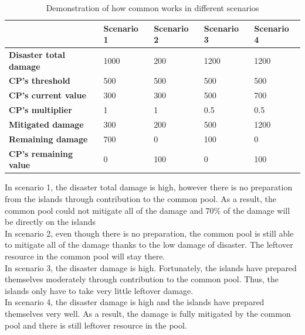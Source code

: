 \begin{table}[h]
\begin{center} 
\begin{tabular}{|p{0.9in}|p{0.9in}|p{0.9in}|p{0.9in}|p{0.9in}|} \hline
& \textbf{Scenario 1} & \textbf{Scenario 2} & \textbf{Scenario 3} & \textbf{Scenario 4} \\ \hline
\textbf{Disaster total damage} & 1000 & 200 & 1200 & 1200 \\ \hline
\textbf{CP's threshold} & 500 & 500 & 500 & 500 \\ \hline
\textbf{CP's current value} & 300 & 300 & 500 & 700 \\ \hline
\textbf{CP's multiplier} & 1 & 1 & 0.5 & 0.5 \\ \hline
\textbf{Mitigated damage} & 300 & 200 & 500 & 1200 \\ \hline
\textbf{Remaining damage} & 700 & 0 & 100 & 0 \\ \hline
\textbf{CP's remaining value} & 0 & 100 & 0 & 100 \\ \hline
\end{tabular}
\caption{\label{tab:table-name}Demonstration of how common works in different scenarios}
\end{center} 
\end{table}

In scenario 1, the disaster total damage is high, however there is no preparation from the islands through contribution to the common pool. As a result, the common pool could not mitigate all of the damage and 70\% of the damage will be directly on the islands\\

In scenario 2, even though there is no preparation, the common pool is still able to mitigate all of the damage thanks to the low damage of disaster. The leftover resource in the common pool will stay there.\\

In scenario 3, the disaster damage is high. Fortunately, the islands have prepared themselves moderately through contribution to the common pool. Thus, the islands only have to take very little leftover damage.\\

In scenario 4, the disaster damage is high and the islands have prepared themselves very well. As a result, the damage is fully mitigated by the common pool and there is still leftover resource in the pool. 


